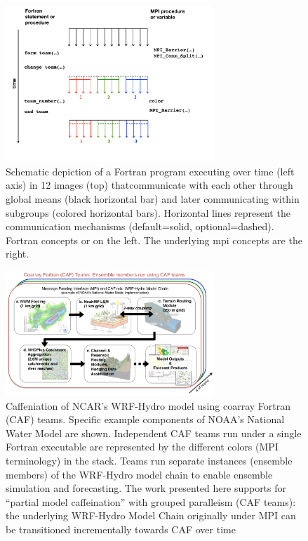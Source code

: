 \begin{figure}
\includegraphics[width=0.7\textwidth]{figures/teams}
\vspace{-36pt}
\caption{Schematic depiction of a Fortran program executing over time (left axis) in 12 images (top) thatcommunicate with each other through global means (black horizontal bar) and later communicating within subgroups (colored horizontal bars).  Horizontal lines represent the communication mechanisms (default=solid, optional=dashed).  Fortran concepts or on the left.  The underlying \gls{mpi} concepts are the right.}
\end{figure}
%

\begin{figure}
\includegraphics[width=0.7\textwidth]{figures/WRF-Hydro-caf-ens-model_chain.png}
\vspace{-7pt}
\caption{Caffeniation of NCAR's WRF-Hydro model using coarray Fortran (CAF)
  teams. Specific example components of  NOAA's National Water
  Model are shown. Independent CAF teams run under a single Fortran executable are represented by the different colors
  (MPI terminology) in the stack.  Teams run separate instances
  (ensemble members) of the WRF-Hydro model chain to enable ensemble
  simulation and forecasting. The work presented  here supports for ``partial model caffeination'' with grouped
  paralleism (CAF teams): the underlying WRF-Hydro Model Chain
  originally under MPI can be transitioned incrementally towards CAF
  over time}
\end{figure}
%
